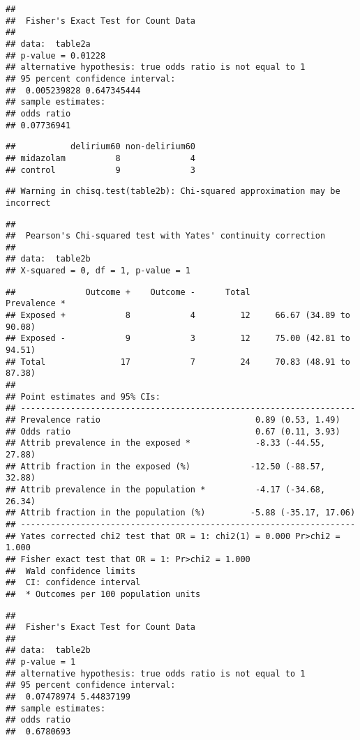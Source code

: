 \documentclass[
]{article}
\begin{document}
\begin{verbatim}
## 
##  Fisher's Exact Test for Count Data
## 
## data:  table2a
## p-value = 0.01228
## alternative hypothesis: true odds ratio is not equal to 1
## 95 percent confidence interval:
##  0.005239828 0.647345444
## sample estimates:
## odds ratio 
## 0.07736941
\end{verbatim}

\begin{verbatim}
##           delirium60 non-delirium60
## midazolam          8              4
## control            9              3
\end{verbatim}

\begin{verbatim}
## Warning in chisq.test(table2b): Chi-squared approximation may be incorrect
\end{verbatim}

\begin{verbatim}
## 
##  Pearson's Chi-squared test with Yates' continuity correction
## 
## data:  table2b
## X-squared = 0, df = 1, p-value = 1
\end{verbatim}

\begin{verbatim}
##              Outcome +    Outcome -      Total               Prevalence *
## Exposed +            8            4         12     66.67 (34.89 to 90.08)
## Exposed -            9            3         12     75.00 (42.81 to 94.51)
## Total               17            7         24     70.83 (48.91 to 87.38)
## 
## Point estimates and 95% CIs:
## -------------------------------------------------------------------
## Prevalence ratio                               0.89 (0.53, 1.49)
## Odds ratio                                     0.67 (0.11, 3.93)
## Attrib prevalence in the exposed *             -8.33 (-44.55, 27.88)
## Attrib fraction in the exposed (%)            -12.50 (-88.57, 32.88)
## Attrib prevalence in the population *          -4.17 (-34.68, 26.34)
## Attrib fraction in the population (%)         -5.88 (-35.17, 17.06)
## -------------------------------------------------------------------
## Yates corrected chi2 test that OR = 1: chi2(1) = 0.000 Pr>chi2 = 1.000
## Fisher exact test that OR = 1: Pr>chi2 = 1.000
##  Wald confidence limits
##  CI: confidence interval
##  * Outcomes per 100 population units
\end{verbatim}

\begin{verbatim}
## 
##  Fisher's Exact Test for Count Data
## 
## data:  table2b
## p-value = 1
## alternative hypothesis: true odds ratio is not equal to 1
## 95 percent confidence interval:
##  0.07478974 5.44837199
## sample estimates:
## odds ratio 
##  0.6780693
\end{verbatim}
\end{document}
